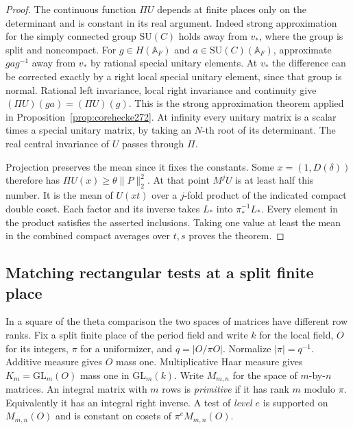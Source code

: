 \documentclass[a4paper,11pt]{article}
\theoremstyle{definition}
\theoremstyle{remark}
\numberwithin{equation}{section}
\begin{document}
\begin{proof}
The continuous function \(\Pi U\) depends at finite places
only on the determinant and is constant in its real argument.
Indeed strong approximation for the simply connected group
\(\mathrm{SU}(C)\) holds away from \(v_*\), where the group is
split and noncompact. For \(g\in H(\mathbb A_F)\) and
\(a\in\mathrm{SU}(C)(\mathbb A_F)\), approximate \(gag^{-1}\)
away from \(v_*\) by rational special unitary elements. At
\(v_*\) the difference can be corrected exactly by a right
local special unitary element, since that group is normal.
Rational left invariance, local right invariance and continuity
give \((\Pi U)(ga)=(\Pi U)(g)\).
This is the strong approximation theorem applied in
Proposition~\ref{prop:corehecke272}. At infinity every unitary
matrix is a scalar times a special unitary matrix, by taking
an \(N\)-th root of its determinant. The real central
invariance of \(U\) passes through \(\Pi\).

Projection preserves the mean since it fixes the constants.
Some \(x=(1,D(\delta))\) therefore has
\(\Pi U(x)\ge\theta\|P\|_2^2\). At that point \(M^jU\) is
at least half this number. It is the mean of \(U(xt)\) over
a \(j\)-fold product of the indicated compact double coset.
Each factor and its inverse takes \(L_*\) into
\(\pi_*^{-1}L_*\). Every element in the product satisfies
the asserted inclusions. Taking one value at least the
mean in the combined compact averages over \(t,s\) proves
the theorem.
\end{proof}

\subsection{Matching rectangular tests at a split finite place}\label{sec:matchingframes334}

In a square of the theta comparison the two spaces of matrices have
different row ranks. Fix a split finite place of the period field and
write \(k\) for the local field, \(O\) for its integers, \(\pi\) for a
uniformizer, and \(q=|O/\pi O|\). Normalize \(|\pi|=q^{-1}\).
Additive measure gives \(O\) mass one. Multiplicative Haar measure gives
\(K_m=\mathrm{GL}_m(O)\) mass one in \(\mathrm{GL}_m(k)\).
Write \(M_{m,n}\) for the space of \(m\)-by-\(n\) matrices. An integral
matrix with \(m\) rows is \emph{primitive} if it has rank \(m\) modulo
\(\pi\). Equivalently it has an integral right inverse. A test of
\emph{level \(e\)} is supported on \(M_{m,n}(O)\) and is constant on
cosets of \(\pi^e M_{m,n}(O)\).
\end{document}
